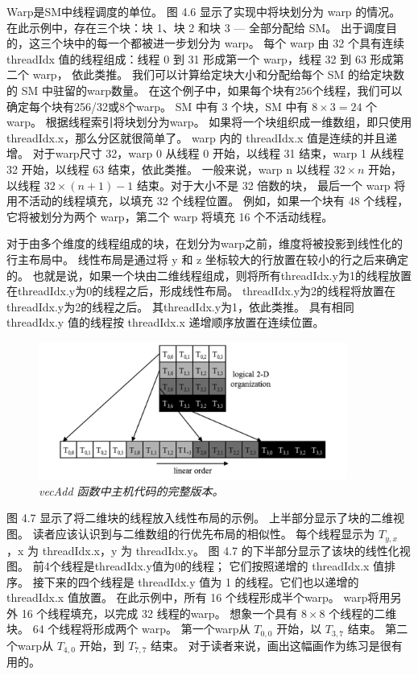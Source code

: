 Warp是SM中线程调度的单位。 图 4.6 显示了实现中将块划分为 warp 的情况。 
在此示例中，存在三个块：块 1、块 2 和块 3 — 全部分配给 SM。 出于调度目的，这三个块中的每一个都被进一步划分为 warp。 
每个 warp 由 32 个具有连续 threadIdx 值的线程组成：线程 0 到 31 形成第一个 warp，线程 32 到 63 形成第二个 warp，
依此类推。 我们可以计算给定块大小和分配给每个 SM 的给定块数的 SM 中驻留的warp数量。 
在这个例子中，如果每个块有256个线程，我们可以确定每个块有256/32或8个warp。 
SM 中有 3 个块，SM 中有 $8 \times 3 = 24$ 个warp。 根据线程索引将块划分为warp。 
如果将一个块组织成一维数组，即只使用threadIdx.x，那么分区就很简单了。 warp 内的 threadIdx.x 值是连续的并且递增。 
对于warp尺寸 32，warp 0 从线程 0 开始，以线程 31 结束，warp 1 从线程 32 开始，以线程 63 结束，依此类推。 
一般来说，warp n 以线程 $32 \times n$ 开始，以线程 $32 \times (n+1) - 1$ 结束。对于大小不是 32 倍数的块，
最后一个 warp 将用不活动的线程填充，以填充 32 个线程位置。 
例如，如果一个块有 48 个线程，它将被划分为两个 warp，第二个 warp 将填充 16 个不活动线程。

对于由多个维度的线程组成的块，在划分为warp之前，维度将被投影到线性化的行主布局中。 
线性布局是通过将 y 和 z 坐标较大的行放置在较小的行之后来确定的。 
也就是说，如果一个块由二维线程组成，则将所有threadIdx.y为1的线程放置在threadIdx.y为0的线程之后，形成线性布局。
threadIdx.y为2的线程将放置在threadIdx.y为2的线程之后。 其threadIdx.y为1，依此类推。 
具有相同 threadIdx.y 值的线程按 threadIdx.x 递增顺序放置在连续位置。

\begin{figure}[H]
	\centering
	\includegraphics[width=0.9\textwidth]{figs/F4.7.png}
	\caption{\textit{\color{red} vecAdd 函数中主机代码的完整版本。}}
\end{figure}

图 4.7 显示了将二维块的线程放入线性布局的示例。 上半部分显示了块的二维视图。 
读者应该认识到与二维数组的行优先布局的相似性。 每个线程显示为 $T_{y,x}$ ，x 为 threadIdx.x，y 为 threadIdx.y。 
图 4.7 的下半部分显示了该块的线性化视图。 前4个线程是threadIdx.y值为0的线程； 它们按照递增的 threadIdx.x 值排序。 
接下来的四个线程是 threadIdx.y 值为 1 的线程。它们也以递增的 threadIdx.x 值放置。 
在此示例中，所有 16 个线程形成半个warp。 warp将用另外 16 个线程填充，以完成 32 线程的warp。 
想象一个具有 $8 \times 8$ 个线程的二维块。 64 个线程将形成两个 warp。 
第一个warp从 $T_{0,0}$ 开始，以 $T_{3,7}$ 结束。 
第二个warp从 $T_{4,0}$ 开始，到 $T_{7,7}$ 结束。 对于读者来说，画出这幅画作为练习是很有用的。

